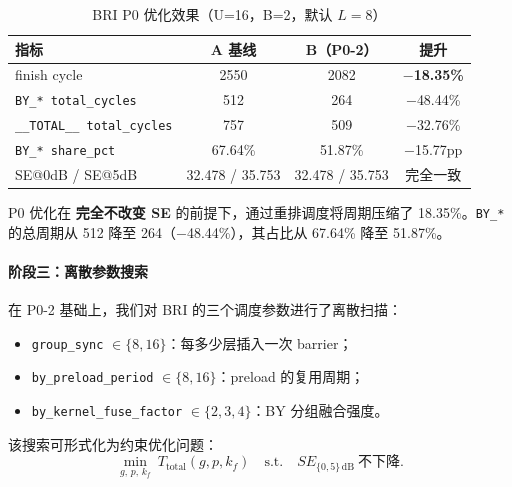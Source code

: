     \begin{table}[H]
        \centering
        \caption{BRI P0 优化效果（U=16，B=2，默认 $L=8$）}
        \begin{tabular}{l c c c}
            \toprule \textbf{指标}                 & \textbf{A 基线}   & \textbf{B（P0-2）} & \textbf{提升}         \\
            \midrule finish cycle                & 2550            & 2082             & \textbf{$-$18.35\%} \\
            \texttt{BY\_* total\_cycles}         & 512             & 264              & $-$48.44\%          \\
            \texttt{\_\_TOTAL\_\_ total\_cycles} & 757             & 509              & $-$32.76\%          \\
            \texttt{BY\_* share\_pct}            & 67.64\%         & 51.87\%          & $-$15.77pp          \\
            SE@0dB / SE@5dB                      & 32.478 / 35.753 & 32.478 / 35.753  & 完全一致                \\
            \bottomrule
        \end{tabular}
    \end{table}

    P0 优化在 \textbf{完全不改变 SE} 的前提下，通过重排调度将周期压缩了 18.35\%。\texttt{BY\_*}
    的总周期从 512 降至 264（$-$48.44\%），其占比从 67.64\% 降至 51.87\%。

    \paragraph{阶段三：离散参数搜索}

    在 P0-2 基础上，我们对 BRI 的三个调度参数进行了离散扫描：

    \begin{itemize}
        \item \texttt{group\_sync} $\in\{8,16\}$：每多少层插入一次 barrier；

        \item \texttt{by\_preload\_period} $\in\{8,16\}$：preload 的复用周期；

        \item \texttt{by\_kernel\_fuse\_factor} $\in\{2,3,4\}$：BY 分组融合强度。
    \end{itemize}

    该搜索可形式化为约束优化问题：
    \begin{equation}
        \min_{g,\,p,\,k_f}\ T_{\text{total}}(g,p,k_{f})\quad\text{s.t.}\quad SE_{\{0,5\}\,\mathrm{dB}}
        \ \text{不下降}.
    \end{equation}

